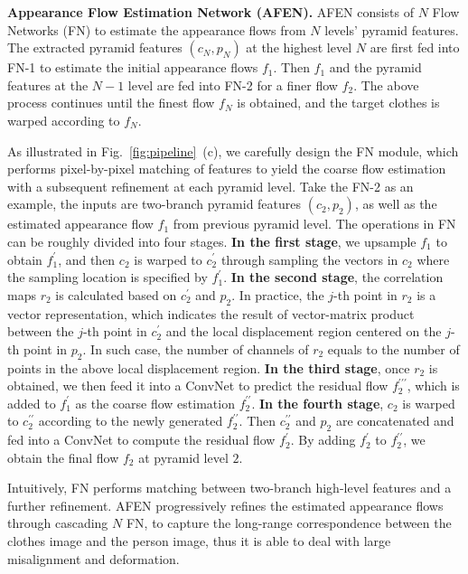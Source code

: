 \documentclass[final]{cvpr}
\begin{document}
	
	\textbf{Appearance Flow Estimation Network (AFEN).}
AFEN consists of $N$ Flow Networks (FN) to estimate the appearance flows from $N$ levels' pyramid features.
The extracted pyramid features $(c_N,p_N)$ at the highest level $N$ are first fed into FN-1 to estimate the initial appearance flows $f_1$.
Then $f_1$ and the pyramid features at the $N-1$ level are fed into FN-2 for a finer flow $f_2$.
The above process continues until the finest flow $f_N$ is obtained, and the target clothes is warped according to $f_N$.
	
As illustrated in Fig.~\ref{fig:pipeline}~(c), 
we carefully design the FN module, which performs pixel-by-pixel matching of features to yield the coarse flow estimation with a subsequent refinement at each pyramid level.
Take the FN-2 as an example, the inputs are two-branch pyramid features $(c_2,p_2)$, as well as the estimated appearance flow $f_1$ from previous pyramid level.
The operations in FN can be roughly divided into four stages.
\textbf{In the first stage}, we upsample $f_1$ to obtain $f^{\prime}_1$, and then $c_{2}$ is warped to $c^{\prime}_{2}$ 
	through sampling the vectors in $c_2$ where the sampling location is specified by $f^{\prime}_1$.
\textbf{In the second stage}, the correlation maps $r_2$ is calculated based on $c^{\prime}_{2}$ and $p_{2}$.
In practice, the $j$-th point in $r_2$ is a vector representation, which indicates the result of vector-matrix product between the $j$-th point in $c^{\prime}_{2}$ and the local displacement region centered on the $j$-th point in $p_{2}$.
In such case, the number of channels of $r_2$ equals to the number of points in the above local displacement region. 
\textbf{In the third stage}, once $r_2$ is obtained, we then feed it into a ConvNet to predict the residual flow $f^{\prime \prime \prime}_2$, which is added to $f^{\prime}_1$ as the coarse flow estimation $f^{\prime \prime}_2$.
\textbf{In the fourth stage}, $c_{2}$ is warped to $c^{\prime \prime}_{2}$ according to the newly generated $f^{\prime \prime}_2$.
Then $c^{\prime \prime}_{2}$ and $p_{2}$ are concatenated and fed into a ConvNet to compute the residual flow $f^{\prime}_2$.
By adding $f^{\prime}_2$ to $f^{\prime \prime}_2$, we obtain the final flow $f_2$ at pyramid level $2$.
	
Intuitively, FN performs matching between two-branch high-level features and a further refinement.
AFEN progressively refines the estimated appearance flows through cascading $N$ FN, to capture the long-range correspondence between the clothes image and the person image, thus it is able to deal with large misalignment and deformation. 
\end{document}
